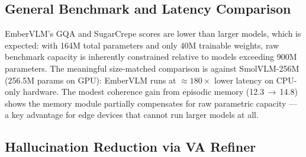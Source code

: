 \documentclass[runningheads]{llncs}
\begin{document}
\subsection{General Benchmark and Latency Comparison}

\begin{table}[ht]
\centering
\caption{Standard multimodal benchmarks. Coherence\,=\,avg(GQA, Winoground, SugarCrepe). EmberVLM latency is CPU-only; baselines run on GPU.}
\label{tab:baselines}
\setlength{\tabcolsep}{4pt}

\end{table}

EmberVLM's GQA and SugarCrepe scores are lower than larger models, which is expected:
with 164M total parameters and only 40M trainable weights, raw benchmark capacity is
inherently constrained relative to models exceeding 900M parameters. The meaningful
size-matched comparison is against SmolVLM-256M (256.5M params on GPU): EmberVLM
runs at ${\approx}180\times$ lower latency on CPU-only hardware. The modest coherence gain from
episodic memory (12.3\,$\rightarrow$\,14.8) shows the memory module partially
compensates for raw parametric capacity — a key advantage for edge devices that
cannot run larger models at all.

\subsection{Hallucination Reduction via VA Refiner}
\end{document}
